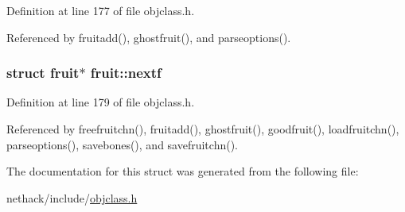 Definition at line 177 of file objclass.\+h.



Referenced by fruitadd(), ghostfruit(), and parseoptions().

\hypertarget{structfruit_abdefc7da964abc0fe643d941b7ab3057}{
\subsubsection[{nextf}]{\setlength{\rightskip}{0pt plus 5cm}struct {\bf fruit}$\ast$ fruit\+::nextf}}\label{structfruit_abdefc7da964abc0fe643d941b7ab3057}


Definition at line 179 of file objclass.\+h.



Referenced by freefruitchn(), fruitadd(), ghostfruit(), goodfruit(), loadfruitchn(), parseoptions(), savebones(), and savefruitchn().



The documentation for this struct was generated from the following file\+:\begin{DoxyCompactItemize}
\item 
nethack/include/\hyperlink{objclass_8h}{objclass.\+h}\end{DoxyCompactItemize}
